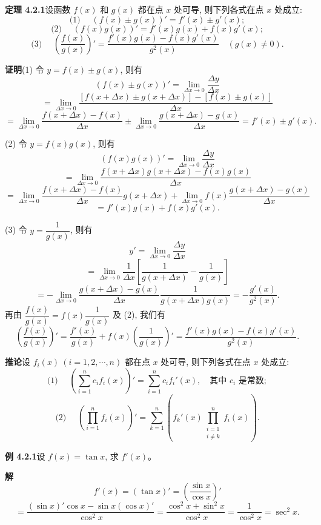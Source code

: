 \documentclass[UTF8,12pt,a4paper,fontset=fandol]{ctexart}
\begin{document}
\noindent\textbf{定理 4.2.1}\quad 设函数 $f(x)$ 和 $g(x)$ 都在点 $x$ 处可导, 则下列各式在点 $x$ 处成立:
\[
  \text{(1) }\quad
  (f(x)\pm g(x))'=f'(x)\pm g'(x);
\]
\[
  \text{(2) }\quad
  (f(x)g(x))'=f'(x)g(x)+f(x)g'(x);
\]
\[
  \text{(3) }\quad
  \left(\frac{f(x)}{g(x)}\right)'
  =
  \frac{f'(x)g(x)-f(x)g'(x)}{g^2(x)}
  \quad(g(x)\ne0).
\]

\noindent\textbf{证明}\quad (1) 令 $y=f(x)\pm g(x)$, 则有
\[
  (f(x)\pm g(x))'
  =
  \lim_{\Delta x\to0}\frac{\Delta y}{\Delta x}
\]
\[
  =
  \lim_{\Delta x\to0}
  \frac{[f(x+\Delta x)\pm g(x+\Delta x)]-[f(x)\pm g(x)]}
       {\Delta x}
\]
\[
  =
  \lim_{\Delta x\to0}\frac{f(x+\Delta x)-f(x)}{\Delta x}
  \pm
  \lim_{\Delta x\to0}\frac{g(x+\Delta x)-g(x)}{\Delta x}
  =
  f'(x)\pm g'(x).
\]

(2) 令 $y=f(x)g(x)$, 则有
\[
  (f(x)g(x))'
  =
  \lim_{\Delta x\to0}\frac{\Delta y}{\Delta x}
\]
\[
  =
  \lim_{\Delta x\to0}
  \frac{f(x+\Delta x)g(x+\Delta x)-f(x)g(x)}
       {\Delta x}
\]
\[
  =
  \lim_{\Delta x\to0}
  \frac{f(x+\Delta x)-f(x)}{\Delta x}g(x+\Delta x)
  +
  \lim_{\Delta x\to0}
  f(x)\frac{g(x+\Delta x)-g(x)}{\Delta x}
\]
\[
  =
  f'(x)g(x)+f(x)g'(x).
\]

(3) 令 $y=\dfrac1{g(x)}$, 则有
\[
  y'=
  \lim_{\Delta x\to0}\frac{\Delta y}{\Delta x}
\]
\[
  =
  \lim_{\Delta x\to0}
  \frac1{\Delta x}
  \left[
    \frac1{g(x+\Delta x)}-\frac1{g(x)}
  \right]
\]
\[
  =
  -
  \lim_{\Delta x\to0}
  \frac{g(x+\Delta x)-g(x)}{\Delta x}
  \frac1{g(x+\Delta x)g(x)}
  =
  -\frac{g'(x)}{g^2(x)}.
\]
再由 $\dfrac{f(x)}{g(x)}=f(x)\dfrac1{g(x)}$ 及 (2), 我们有
\[
  \left(\frac{f(x)}{g(x)}\right)'
  =
  \frac{f'(x)}{g(x)}
  +
  f(x)\left(\frac1{g(x)}\right)'
  =
  \frac{f'(x)g(x)-f(x)g'(x)}{g^2(x)}.
\]

\noindent\textbf{推论}\quad 设 $f_i(x)\ (i=1,2,\cdots,n)$ 都在点 $x$ 处可导, 则下列各式在点 $x$ 处成立:
\[
  \text{(1) }\quad
  \left(\sum_{i=1}^{n}c_if_i(x)\right)'
  =
  \sum_{i=1}^{n}c_if_i'(x),
  \quad\text{其中 }c_i\text{ 是常数};
\]
\[
  \text{(2) }\quad
  \left(\prod_{i=1}^{n}f_i(x)\right)'
  =
  \sum_{k=1}^{n}
  \left(
    f_k'(x)\prod_{\substack{i=1\\i\ne k}}^{n}f_i(x)
  \right).
\]

\noindent\textbf{例 4.2.1}\quad 设 $f(x)=\tan x$, 求 $f'(x)$。

\noindent\textbf{解}\quad
\[
  f'(x)=(\tan x)'=\left(\frac{\sin x}{\cos x}\right)'
\]
\[
  =
  \frac{(\sin x)'\cos x-\sin x(\cos x)'}{\cos^2 x}
  =
  \frac{\cos^2 x+\sin^2 x}{\cos^2 x}
  =
  \frac1{\cos^2 x}
  =
  \operatorname{sec}^2x.
\]
\end{document}
